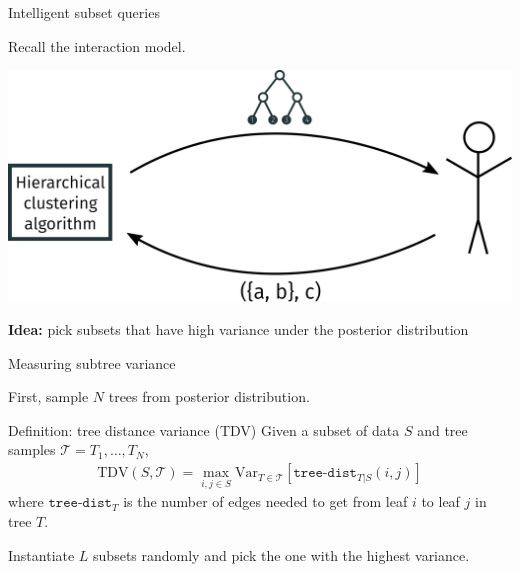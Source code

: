 \documentclass[10pt, compress]{beamer}
\begin{document}
\begin{frame}{Intelligent subset queries}

  Recall the interaction model.

  \begin{center}
    \includegraphics[width=\textwidth]{img/interaction-3}
  \end{center}

  \pause



  \textbf{Idea:}  pick subsets that have high variance
  under the posterior distribution

\end{frame}

\begin{frame}{Measuring subtree variance}

    First, sample $N$ trees from posterior distribution.

  \pause

  \begin{block}{Definition: tree distance variance (TDV)}
    Given a subset of data $S$ and tree samples $\mathcal{T} = T_1, \ldots, T_N$,
    \begin{align}
      \mathrm{TDV}(S, \mathcal{T}) = \max_{i, j \in S}  \mathrm{Var}_{T \in \mathcal{T}}\left[\texttt{tree-dist}_{T|S}(i, j)\right]
    \end{align}
  where $\texttt{tree-dist}_T$ is the number of edges needed to get from leaf $i$ to leaf $j$
  in tree $T$.
  \end{block}

  \pause

Instantiate $L$ subsets randomly and pick the one with the highest variance.

\end{frame}
\end{document}
